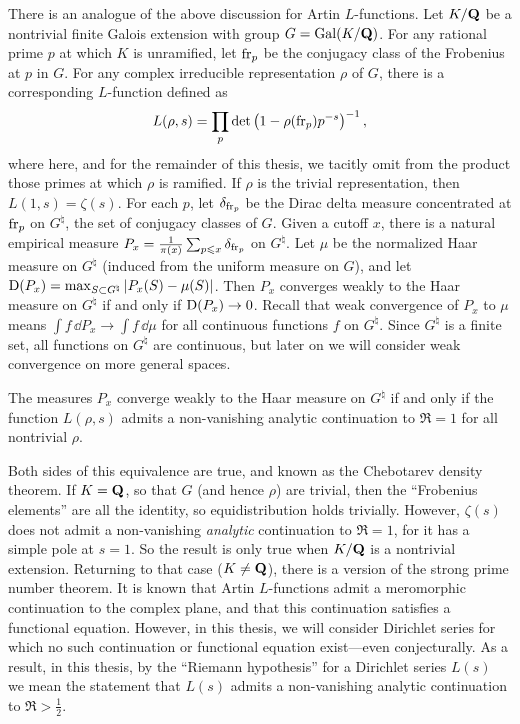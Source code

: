 There is an analogue of the above discussion for Artin $L$-functions. 
Let $K/\mathbf{Q}$ be a nontrivial finite  Galois extension with group 
$G=\operatorname{Gal}(K/\mathbf{Q})$. For any 
rational prime $p$ at which $K$ is unramified, let $\mathrm{fr}_p$ be the conjugacy 
class of the Frobenius at $p$ in $G$. For any complex irreducible representation 
$\rho$ of $G$, there is a corresponding $L$-function defined as 
\[
	L(\rho,s) = \prod_p \det\left(1-\rho(\mathrm{fr}_p) p^{-s}\right)^{-1} ,
\]
where here, and for the remainder of this thesis, we tacitly omit from the 
product those primes at which $\rho$ is ramified. If $\rho$ is the trivial 
representation, then $L(1,s) = \zeta(s)$. For each $p$, let $\delta_{\mathrm{fr}_p}$ 
be the Dirac delta measure concentrated at $\mathrm{fr}_p$ on $G^\natural$, the set 
of conjugacy classes of $G$. Given a cutoff $x$, there is a 
natural empirical measure 
$P_x = \frac{1}{\pi(x)} \sum_{p\leqslant x} \delta_{\mathrm{fr}_p}$ on $G^\natural$.
Let $\mu$ be the normalized Haar measure 
on $G^\natural$ (induced from the uniform measure on $G$), and let 
$\operatorname{D}(P_x) = \max_{S\subset G^\natural} \left| P_x(S) - \mu(S)\right|$. 
Then $P_x$ converges weakly to the Haar measure on $G^\natural$ if and 
only if $\operatorname{D}(P_x) \to 0$. Recall that weak convergence of $P_x$ to $\mu$ means 
$\int f\, \dd P_x \to \int f\, \dd\mu$ for all continuous functions $f$ on 
$G^\natural$. Since $G^\natural$ is a finite set, all functions on $G^\natural$ 
are continuous, but later on we will consider weak convergence on more general 
spaces.  

\begin{theorem}
The measures $P_x$ converge weakly to the Haar measure on $G^\natural$ if and 
only if the function $L(\rho,s)$ admits a non-vanishing analytic continuation 
to $\Re = 1$ for all nontrivial $\rho$. 
\end{theorem}

Both sides of this equivalence are true, and known as the Chebotarev density 
theorem. If $K = \mathbf{Q}$, so that $G$ (and hence $\rho$) are trivial, then the 
``Frobenius elements'' are all the identity, so equidistribution holds 
trivially. However, $\zeta(s)$ does not admit a non-vanishing \emph{analytic} 
continuation to $\Re = 1$, for it has a simple pole at $s = 1$. So the 
result is only true when $K/\mathbf{Q}$ is a nontrivial extension. Returning to that 
case ($K\ne \mathbf{Q}$), there is a version of the strong prime number theorem. It is 
known that Artin $L$-functions admit a meromorphic continuation to the complex 
plane, and that this continuation satisfies a functional equation. However, in 
this thesis, we will consider Dirichlet series for which no such continuation 
or functional equation exist---even conjecturally. As a result, in this thesis, 
by the ``Riemann hypothesis'' for a Dirichlet series $L(s)$ we mean the 
statement that $L(s)$ admits a non-vanishing analytic continuation to 
$\Re > \frac 1 2$. 

